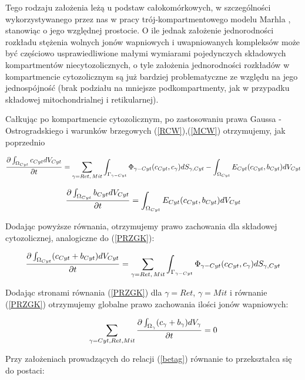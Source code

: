 \medskip 

Tego rodzaju założenia leżą u podstaw całokomórkowych, w szczególności wykorzystywanego przez nas w pracy trój-kompartmentowego modelu Marhla \cite{Marhl2000}, stanowiąc o jego względnej prostocie. O ile jednak założenie jednorodności rozkładu stężenia wolnych jonów wapniowych i uwapniowanych kompleksów może być częściowo usprawiedliwione małymi wymiarami pojedynczych składowych kompartmentów niecytozolicznych, o tyle założenia jednorodności rozkładów w kompartmencie cytozolicznym są już bardziej problematyczne ze względu na jego jednospójność (brak podziału na mniejsze podkompartmenty, jak w przypadku składowej mitochondrialnej i retikularnej). 

\medskip 
\noindent Całkując po kompartmencie cytozolicznym, po zastosowaniu prawa Gaussa - Ostrogradskiego i warunków brzegowych (\ref{RCW}),(\ref{MCW}) otrzymujemy, jak poprzednio 

\begin{equation} \label{1cyt}
\frac{\partial \int_{\Omega_{Cyt}}c_{Cyt} dV_{Cyt}}{\partial t} =  \sum_{\gamma = Ret, \,Mit} \int_{\Gamma_{\gamma-Cyt}} \Phi_{\gamma-Cyt}(c_{Cyt},c_\gamma) dS_{\gamma,Cyt}  - \int_{\Omega_{Cyt}}E_{Cyt} (c_{Cyt}, b_{Cyt}) dV_{Cyt} \end{equation} 

\begin{equation}  \label{2cyt}
\frac{\partial \int_{\Omega_{Cyt}}b_{Cyt} dV_{Cyt}}{\partial t} = \int_{\Omega_{Cyt}}E_{Cyt} (c_{Cyt}, b_{Cyt}) dV_{Cyt}  \end{equation} 

\noindent Dodając powyższe równania, otrzymujemy prawo zachowania dla składowej cytozolicznej, analogiczne do (\ref{PRZGK}): 

\begin{equation} \label{PRZCK}
\frac{\partial \int_{\Omega_{Cyt}}(c_{Cyt}+b_{Cyt}) dV_{Cyt}}{\partial t} = \sum_{\gamma = Ret, \,Mit} \int_{\Gamma_{\gamma-Cyt}} \Phi_{\gamma-Cyt} (c_{Cyt},c_\gamma) dS_{\gamma,Cyt}
\end{equation} 

\noindent Dodając stronami równania (\ref{PRZGK}) dla $\gamma=Ret$, $\gamma=Mit$ i równanie (\ref{PRZGK}) otrzymujemy globalne prawo zachowania ilości jonów wapniowych: 

\[  
\sum_{\gamma=Cyt,Ret,Mit} \frac{\partial \int_{\Omega_{\gamma}}(c_{\gamma}+b_{\gamma}) dV_{\gamma}}{\partial t} = 0
\] 

\noindent Przy założeniach prowadzących do relacji (\ref{betag}) równanie to przekształca się do postaci: 

